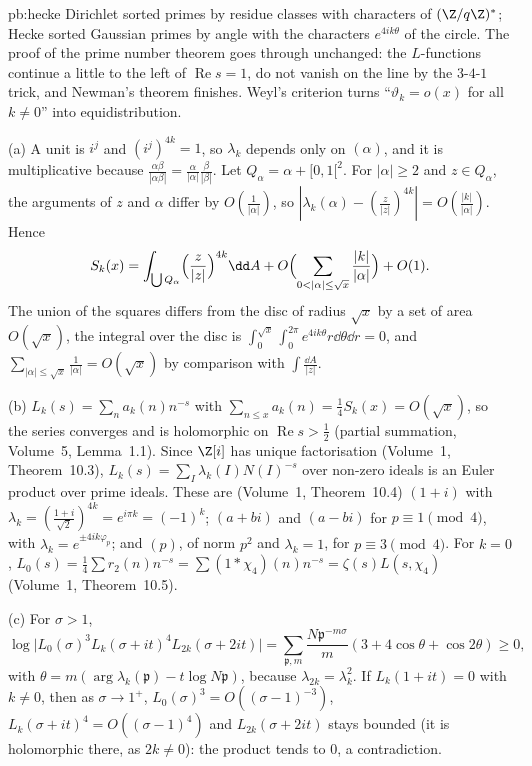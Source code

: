 \begin{solution}{pb:hecke}
\idea Dirichlet sorted primes by residue classes with characters of $(\Z/q\Z)^*$; Hecke sorted Gaussian primes by angle with the characters $e^{4ik\theta}$ of the circle. The
proof of the prime number theorem goes through unchanged: the $L$-functions continue a little to the left of $\operatorname{Re}s=1$, do not vanish on the line by the $3$-$4$-$1$ trick,
and Newman's theorem finishes. Weyl's criterion turns ``$\vartheta_k=o(x)$ for all $k\ne0$'' into equidistribution.

\writeup (a) A unit is $i^j$ and $(i^j)^{4k}=1$, so $\lambda_k$ depends only on $(\alpha)$, and it is multiplicative because $\frac{\alpha\beta}{|\alpha\beta|}=\frac\alpha{|\alpha|}\frac\beta{|\beta|}$. Let $Q_\alpha=\alpha+[0,1[^2$.
For $|\alpha|\ge2$ and $z\in Q_\alpha$, the arguments of $z$ and $\alpha$ differ by $O(\frac1{|\alpha|})$, so $|\lambda_k(\alpha)-(\frac z{|z|})^{4k}|=O(\frac{|k|}{|\alpha|})$. Hence
\[
S_k(x)=\int_{\bigcup Q_\alpha}\Bigl(\frac z{|z|}\Bigr)^{4k}\dd A+O\Bigl(\sum_{0<|\alpha|\le\sqrt x}\frac{|k|}{|\alpha|}\Bigr)+O(1).
\]
The union of the squares differs from the disc of radius $\sqrt x$ by a set of area $O(\sqrt x)$, the integral over the disc is $\int_0^{\sqrt x}\int_0^{2\pi}e^{4ik\theta}r\dd\theta\dd r=0$,
and $\sum_{|\alpha|\le\sqrt x}\frac1{|\alpha|}=O(\sqrt x)$ by comparison with $\int\frac{\dd A}{|z|}$.

(b) $L_k(s)=\sum_na_k(n)n^{-s}$ with $\sum_{n\le x}a_k(n)=\frac14S_k(x)=O(\sqrt x)$, so the series converges and is holomorphic on $\operatorname{Re}s>\frac12$ (partial summation, Volume~5,
Lemma~1.1). Since $\Z[i]$ has unique factorisation (Volume~1, Theorem~10.3), $L_k(s)=\sum_I\lambda_k(I)N(I)^{-s}$ over non-zero ideals is an Euler product over prime ideals. These are
(Volume~1, Theorem~10.4) $(1+i)$ with $\lambda_k=(\frac{1+i}{\sqrt2})^{4k}=e^{i\pi k}=(-1)^k$; $(a+bi)$ and $(a-bi)$ for $p\equiv1\pmod4$, with $\lambda_k=e^{\pm4ik\varphi_p}$; and $(p)$, of norm
$p^2$ and $\lambda_k=1$, for $p\equiv3\pmod4$. For $k=0$, $L_0(s)=\frac14\sum r_2(n)n^{-s}=\sum(1*\chi_4)(n)n^{-s}=\zeta(s)L(s,\chi_4)$ (Volume~1, Theorem~10.5).

(c) For $\sigma>1$,
\[
\log\bigl|L_0(\sigma)^3L_k(\sigma+it)^4L_{2k}(\sigma+2it)\bigr|=\sum_{\mathfrak p,m}\frac{N\mathfrak p^{-m\sigma}}m(3+4\cos\theta+\cos2\theta)\ge0,
\]
with
$\theta=m(\arg\lambda_k(\mathfrak p)-t\log N\mathfrak p)$, because $\lambda_{2k}=\lambda_k^2$. If $L_k(1+it)=0$ with $k\ne0$, then as $\sigma\to1^+$, $L_0(\sigma)^3=O((\sigma-1)^{-3})$,
$L_k(\sigma+it)^4=O((\sigma-1)^4)$ and $L_{2k}(\sigma+2it)$ stays bounded (it is holomorphic there, as $2k\ne0$): the product tends to $0$, a contradiction.


\end{solution}

